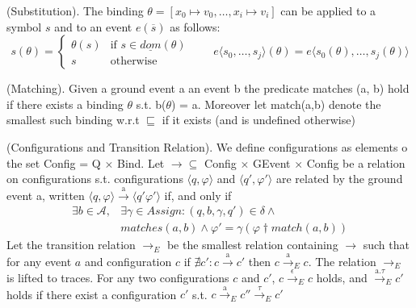 				\begin{dfn}
					(Substitution).
					The binding $\theta = [x_0 \mapsto v_0, \dots, x_i \mapsto v_i]$ can be applied to a symbol $s$ and to an event
					$e(\overline{s})$ as follows: 
					\[
					 s(\theta) = 
					  \begin{cases} 
					   \theta(s) & \text{if } s \in \underline{dom}(\theta) \\
					   s & \text{otherwise}
					  \end{cases}
					  \qquad e \langle s_0,\ldots,s_j \rangle (\theta) = e \langle s_0(\theta),\ldots,s_j(\theta) \rangle
					\]
				\end{dfn}
				
				\begin{dfn}
					(Matching).
					Given a ground event a an event b the predicate matches (a, b) hold if there exists a binding $\theta$ s.t. b($\theta$) = a.
					Moreover let match(a,b) denote the smallest such binding w.r.t $\sqsubseteq$ if it exists (and is undefined otherwise)
				\end{dfn}
				
				\begin{dfn}
					(Configurations and Transition Relation).
					We define configurations as elements o the set Config = Q $\times$ Bind. Let $\rightarrow \subseteq$ Config $\times$ GEvent $\times$ Config be a relation on
					configurations s.t. configurations $\langle q, \varphi \rangle$ and $\langle q', \varphi' \rangle$ are related by the ground event a, written
					$\langle q, \varphi \rangle \xrightarrow{\text{a}} \langle q' \varphi' \rangle$ if, and only if
						\begin{align}
							\exists b \in \mathcal{A}, & \exists \gamma \in Assign : (q, b, \gamma, q') \in \delta \wedge \\
							&matches(a,b) \wedge \varphi' = \gamma(\varphi \dagger match(a,b))
						\end{align}
					Let the transition relation $\rightarrow_{E}$ be the smallest relation containing $\rightarrow$ such that for any event
					$a$ and configuration $c$ if $\nexists c' : c \xrightarrow{\text{a}} c'$ then $ c \xrightarrow{\text{a}}_E c$.
					The relation $\rightarrow_E$ is lifted to traces.
					For any two configurations $c$ and $c'$, $ c \xrightarrow{\text{$\epsilon$}}_E c$ holds, and $\xrightarrow{\text{a.$\tau$}}_E c'$ holds
					if there exist a configuration $c'$ s.t. $c \xrightarrow{\text{a}}_E c'' \xrightarrow{\text{$\tau$}}_E c'$
				\end{dfn}
				
